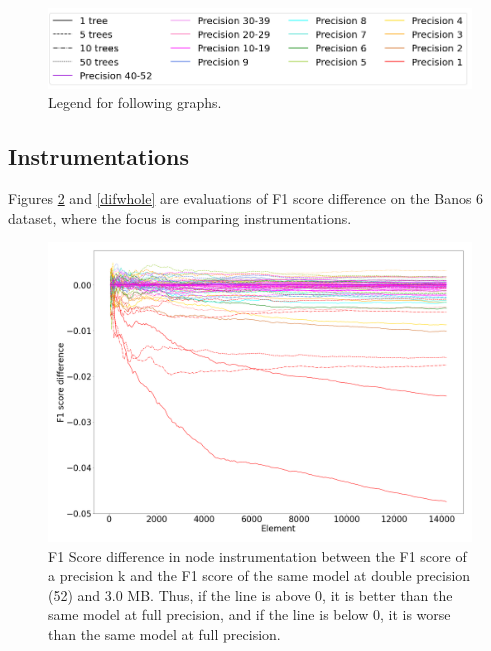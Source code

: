 \documentclass[conference]{IEEEtran}
\begin{document}
\begin{figure}[htbp]
    \centerline{\includegraphics[width=\linewidth]{legend2.png}}
    \caption{Legend for following graphs.}
    \label{legend}
\end{figure}

\subsection{Instrumentations}

Figures \ref{difnode} and \ref{difwhole} are evaluations of F1 score difference
on the Banos 6 dataset, where the focus is comparing instrumentations.

\begin{figure}[htbp]
    \centerline{\includegraphics[width=\linewidth]{difnode11.png}}
    \caption{
        F1 Score difference in node instrumentation between the F1 score of a
        precision k and the F1 score of the same model at double precision (52) and
        3.0 MB. Thus, if the line is above 0, it is better than the same model at
        full precision, and if the line is below 0, it is worse than the same model
        at full precision.}
    \label{difnode}
\end{figure}
\end{document}
